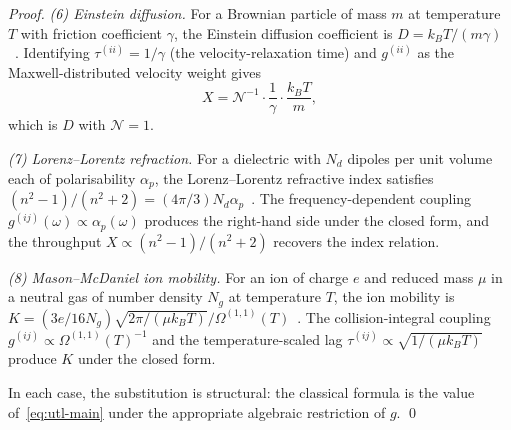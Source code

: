 \documentclass[twocolumn,11pt,a4paper]{article}
\newcommand{\TP}{X}
\newcommand{\Norm}{\mathcal{N}}
\newcommand{\lag}{\tau}
\newcommand{\cpl}{g}
\begin{document}
\begin{proof}
\emph{(6) Einstein diffusion.} For a Brownian particle of mass $m$ at temperature $T$ with friction coefficient $\gamma$, the Einstein diffusion coefficient is $D = k_B T / (m \gamma)$~\citep{einstein1905brownian}. Identifying $\lag^{(ii)} = 1/\gamma$ (the velocity-relaxation time) and $\cpl^{(ii)}$ as the Maxwell-distributed velocity weight gives
\[
\TP = \Norm^{-1} \cdot \frac{1}{\gamma} \cdot \frac{k_B T}{m},
\]
which is $D$ with $\Norm = 1$.

\emph{(7) Lorenz--Lorentz refraction.} For a dielectric with $N_d$ dipoles per unit volume each of polarisability $\alpha_p$, the Lorenz--Lorentz refractive index satisfies $(n^2 - 1) / (n^2 + 2) = (4\pi/3) N_d \alpha_p$~\citep{lorenz1880,lorentz1880}. The frequency-dependent coupling $\cpl^{(ij)}(\omega) \propto \alpha_p(\omega)$ produces the right-hand side under the closed form, and the throughput $\TP \propto (n^2 - 1)/(n^2 + 2)$ recovers the index relation.

\emph{(8) Mason--McDaniel ion mobility.} For an ion of charge $e$ and reduced mass $\mu$ in a neutral gas of number density $N_g$ at temperature $T$, the ion mobility is $K = (3 e / 16 N_g) \sqrt{2\pi / (\mu k_B T)} / \Omega^{(1,1)}(T)$~\citep{mason1988transport}. The collision-integral coupling $\cpl^{(ij)} \propto \Omega^{(1,1)}(T)^{-1}$ and the temperature-scaled lag $\lag^{(ij)} \propto \sqrt{1 / (\mu k_B T)}$ produce $K$ under the closed form.

In each case, the substitution is structural: the classical formula is the value of~\eqref{eq:utl-main} under the appropriate algebraic restriction of $\cpl$. \qed
\end{proof}
\end{document}
